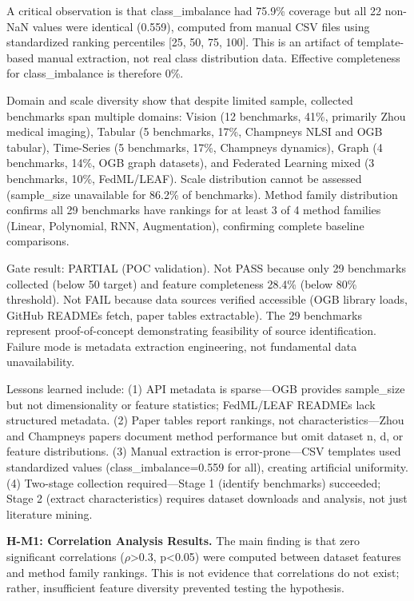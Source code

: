 A critical observation is that class\_imbalance had 75.9\% coverage but all 22 non-NaN values were identical (0.559), computed from manual CSV files using standardized ranking percentiles [25, 50, 75, 100]. This is an artifact of template-based manual extraction, not real class distribution data. Effective completeness for class\_imbalance is therefore 0\%.

Domain and scale diversity show that despite limited sample, collected benchmarks span multiple domains: Vision (12 benchmarks, 41\%, primarily Zhou medical imaging), Tabular (5 benchmarks, 17\%, Champneys NLSI and OGB tabular), Time-Series (5 benchmarks, 17\%, Champneys dynamics), Graph (4 benchmarks, 14\%, OGB graph datasets), and Federated Learning mixed (3 benchmarks, 10\%, FedML/LEAF). Scale distribution cannot be assessed (sample\_size unavailable for 86.2\% of benchmarks). Method family distribution confirms all 29 benchmarks have rankings for at least 3 of 4 method families (Linear, Polynomial, RNN, Augmentation), confirming complete baseline comparisons.

Gate result: PARTIAL (POC validation). Not PASS because only 29 benchmarks collected (below 50 target) and feature completeness 28.4\% (below 80\% threshold). Not FAIL because data sources verified accessible (OGB library loads, GitHub READMEs fetch, paper tables extractable). The 29 benchmarks represent proof-of-concept demonstrating feasibility of source identification. Failure mode is metadata extraction engineering, not fundamental data unavailability.

Lessons learned include: (1) API metadata is sparse---OGB provides sample\_size but not dimensionality or feature statistics; FedML/LEAF READMEs lack structured metadata. (2) Paper tables report rankings, not characteristics---Zhou and Champneys papers document method performance but omit dataset n, d, or feature distributions. (3) Manual extraction is error-prone---CSV templates used standardized values (class\_imbalance=0.559 for all), creating artificial uniformity. (4) Two-stage collection required---Stage 1 (identify benchmarks) succeeded; Stage 2 (extract characteristics) requires dataset downloads and analysis, not just literature mining.

\textbf{H-M1: Correlation Analysis Results.} The main finding is that zero significant correlations ($\rho$>0.3, p<0.05) were computed between dataset features and method family rankings. This is not evidence that correlations do not exist; rather, insufficient feature diversity prevented testing the hypothesis.

